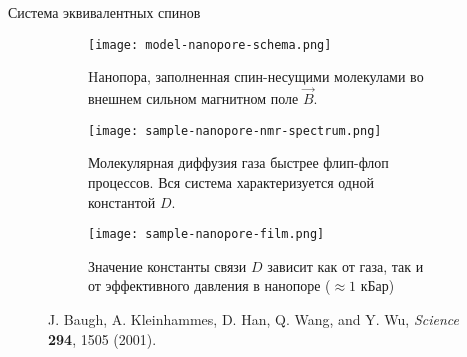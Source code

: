 \begin{frame}{Система эквивалентных спинов}
  \begin{figure}
    \begin{subfigure}[t]{0.32\textwidth}
      \texttt{[image: model-nanopore-schema.png]}
      \caption{
        Hанопора,
        заполненная спин-несущими молекулами во внешнем сильном магнитном поле $\vec B$.
      }
    \end{subfigure}
    \hfill
    \begin{subfigure}[t]{0.32\textwidth}
      \texttt{[image: sample-nanopore-nmr-spectrum.png]}
      \caption{
        Молекулярная диффузия газа быстрее флип-флоп процессов.
        Вся система характеризуется одной константой $D$.
      }
    \end{subfigure}
    \hfill
    \begin{subfigure}[t]{0.32\textwidth}
      \texttt{[image: sample-nanopore-film.png]}
      \caption{
        Значение константы связи $D$ зависит как от газа,
        так и от эффективного давления в нанопоре ($\approx 1$ кБар)
      }
    \end{subfigure}
    \captionsetup{skip=-0.1mm}
    \caption{J. Baugh, A. Kleinhammes, D. Han, Q. Wang, and Y. Wu, \textit{Science} \textbf{294}, 1505 (2001).}
  \end{figure}

%
%
\end{frame}
